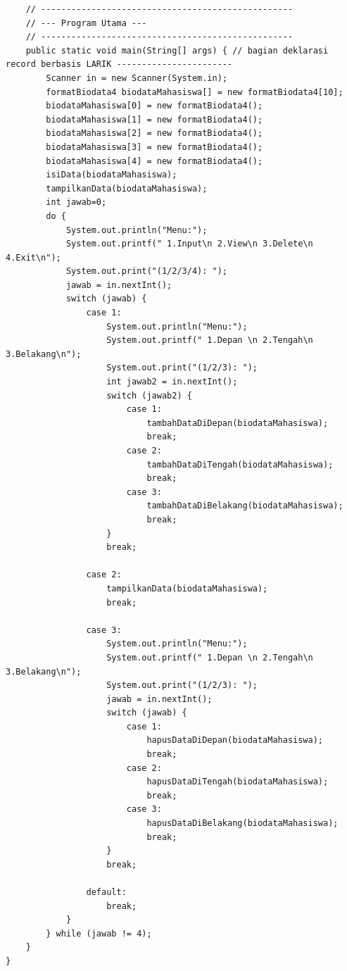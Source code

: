 \documentclass[a4paper,12pt]{article}
\begin{document}
\begin{lstlisting}
    // --------------------------------------------------
    // --- Program Utama ---
    // --------------------------------------------------
    public static void main(String[] args) { // bagian deklarasi record berbasis LARIK -----------------------
        Scanner in = new Scanner(System.in);
        formatBiodata4 biodataMahasiswa[] = new formatBiodata4[10];
        biodataMahasiswa[0] = new formatBiodata4();
        biodataMahasiswa[1] = new formatBiodata4();
        biodataMahasiswa[2] = new formatBiodata4();
        biodataMahasiswa[3] = new formatBiodata4();
        biodataMahasiswa[4] = new formatBiodata4();
        isiData(biodataMahasiswa);
        tampilkanData(biodataMahasiswa);
        int jawab=0;
        do {
            System.out.println("Menu:");
            System.out.printf(" 1.Input\n 2.View\n 3.Delete\n 4.Exit\n");
            System.out.print("(1/2/3/4): ");
            jawab = in.nextInt();
            switch (jawab) {
                case 1:
                    System.out.println("Menu:");
                    System.out.printf(" 1.Depan \n 2.Tengah\n 3.Belakang\n");
                    System.out.print("(1/2/3): ");
                    int jawab2 = in.nextInt();
                    switch (jawab2) {
                        case 1:
                            tambahDataDiDepan(biodataMahasiswa);
                            break;
                        case 2:
                            tambahDataDiTengah(biodataMahasiswa);
                            break;
                        case 3:
                            tambahDataDiBelakang(biodataMahasiswa);
                            break;
                    }
                    break;

                case 2:
                    tampilkanData(biodataMahasiswa);
                    break;

                case 3:
                    System.out.println("Menu:");
                    System.out.printf(" 1.Depan \n 2.Tengah\n 3.Belakang\n");
                    System.out.print("(1/2/3): ");
                    jawab = in.nextInt();
                    switch (jawab) {
                        case 1:
                            hapusDataDiDepan(biodataMahasiswa);
                            break;
                        case 2:
                            hapusDataDiTengah(biodataMahasiswa);
                            break;
                        case 3:
                            hapusDataDiBelakang(biodataMahasiswa);
                            break;
                    }
                    break;

                default:
                    break;
            }
        } while (jawab != 4);
    }
}
\end{lstlisting}
\end{document}
